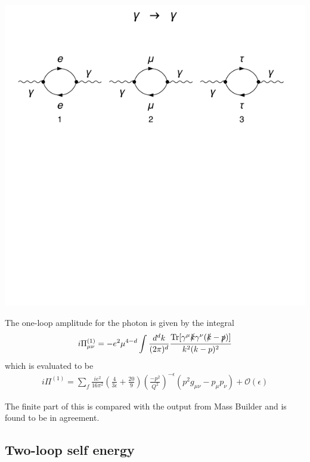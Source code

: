 \documentclass[11pt]{article}
\newcommand{\mb}{\textsf{Mass Builder} }
\begin{document}
\noindent\begin{minipage}{0.3\textwidth}
\begin{center}
\includegraphics{QED_V_1loop.pdf}
\end{center}
\end{minipage}
\noindent\begin{minipage}{0.7\textwidth}
The one-loop amplitude for the photon is given by the integral \cite{Sato2013}
\begin{align}
i\Pi^{(1)}_{\mu\nu} = -e^2\mu^{4-d}\int\frac{d^dk}{(2\pi)^d} \frac{\text{Tr}[\gamma^{\mu}\slashed{k}\gamma^{\nu}(\slashed{k}-\slashed{p}) ]  }{k^2(k-p)^2}
\end{align}
which is evaluated to be \cite{Sato2013}
\begin{align}
i\Pi^{(1)} = \sum_f \frac{ie^2}{16\pi^2} \left(\frac{4}{3\epsilon}+\frac{20}{9}\right)\left(\frac{-p^2}{Q^2}\right)^{-\epsilon}(p^2g_{\mu\nu}-p_{\mu}p_{\nu})+\mathcal{O}(\epsilon)
\end{align}
\end{minipage}
The finite part of this is compared with the output from \mb and is found to be in agreement.

\subsection{Two-loop self energy}
\end{document}
